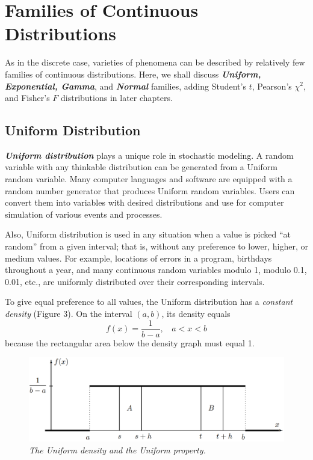\section{Families of Continuous Distributions}

As in the discrete case, varieties of phenomena can be described by relatively few families of continuous distributions. Here, we shall discuss \textit{\textbf{Uniform, Exponential, Gamma}}, and \textit{\textbf{Normal}} families, adding Student's $t$, Pearson's $\chi^2$, and Fisher's $F$ distributions in later chapters.

\subsection{Uniform Distribution}

\textit{\textbf{Uniform distribution}} plays a unique role in stochastic modeling. A random variable with any thinkable distribution can be generated from a Uniform random variable. Many computer languages and software are equipped with a random number generator that produces Uniform random variables. Users can convert them into variables with desired distributions and use for computer simulation of various events and processes.

Also, Uniform distribution is used in any situation when a value is picked ``at random'' from a given interval; that is, without any preference to lower, higher, or medium values. For example, locations of errors in a program, birthdays throughout a year, and many continuous random variables modulo 1, modulo 0.1, 0.01, etc., are uniformly distributed over their corresponding intervals.

To give equal preference to all values, the Uniform distribution has a \textit{constant density} (Figure 3). On the interval $(a, b)$, its density equals
\begin{equation*}
    f(x) = \frac{1}{b - a},\ \ \ \ a < x < b
\end{equation*}
because the rectangular area below the density graph must equal 1.

\begin{figure}[ht]
    \centering
    \includegraphics[width=.5\textwidth]{img/Fig4.4.png}
    \caption{\textit{The Uniform density and the Uniform property.}}
\end{figure}


